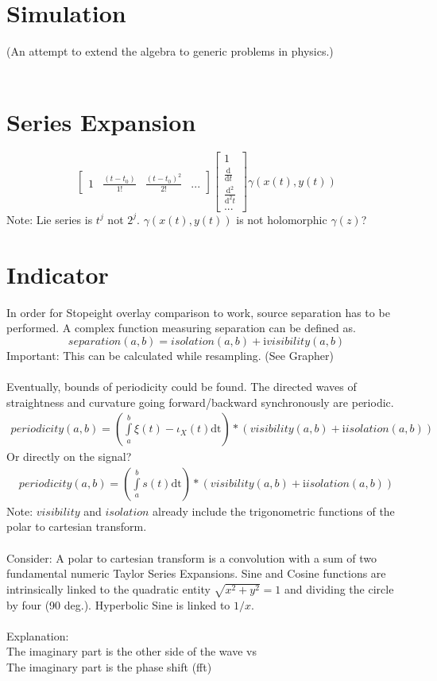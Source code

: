 \documentclass{report}
\begin{document}
\section{Simulation}
(An attempt to extend the algebra to generic problems in physics.)\\\\
\section{Series Expansion}
\begin{equation}
\begin{bmatrix}1 & \frac{(t-t_{0})}{1!} & \frac{(t-t_{0})^{2}}{2!} & ... \end{bmatrix}\begin{bmatrix}1 \\ \frac{\mathrm{d}}{\mathrm{d} t} \\ \frac{\mathrm{d}^2}{\mathrm{d}^2t} \\ ... \end{bmatrix} \gamma (x(t),y(t))
\end{equation}
Note: Lie series is $t^j$ not $2^j$. $\gamma(x(t),y(t))$ is not holomorphic $\gamma(z)$?

\section{Indicator}
In order for Stopeight overlay comparison to work, source separation has to be performed. A complex function measuring separation can be defined as.
\begin{equation}
separation(a,b) = isolation(a,b) + \mathrm{i} visibility(a,b)
\end{equation}
Important: This can be calculated while resampling. (See Grapher)\\\\
Eventually, bounds of periodicity could be found. The directed waves of straightness and curvature going forward/backward synchronously are periodic.
\begin{align}
periodicity(a,b) =  (\int \limits _{a}^{b} \xi(t)-\iota_{X}(t) \mathrm{dt}) *(visibility(a,b) +\mathrm{i} isolation(a,b))
\end{align}
Or directly on the signal?
\begin{align}
periodicity(a,b) =  (\int \limits _{a}^{b} s(t) \mathrm{dt}) *(visibility(a,b) +\mathrm{i} isolation(a,b))
\end{align}
Note: $visibility$ and $isolation$ already include the trigonometric functions of the polar to cartesian transform.\\\\
Consider: A polar to cartesian transform is a convolution with a sum of two fundamental numeric Taylor Series Expansions. Sine and Cosine functions are intrinsically linked to the quadratic entity $\sqrt{x^2 + y^2} =1$ and dividing the circle by four (90 deg.). Hyperbolic Sine is linked to $1/x$.\\\\
Explanation:\\
The imaginary part is the other side of the wave vs\\
The imaginary part is the phase shift (fft)
\end{document}
